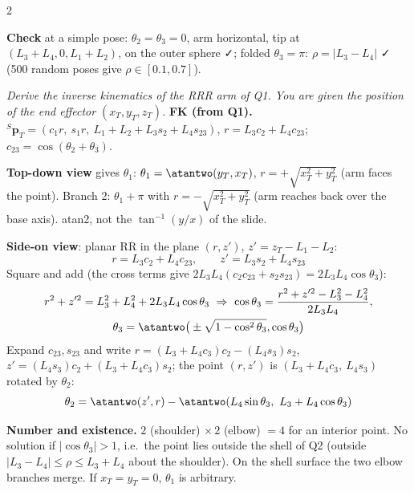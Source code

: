 \begin{multicols}{2}
\begin{examq}
\begin{center}
\end{center}
\textbf{Check} at a simple pose: $\theta_2=\theta_3=0$, arm horizontal, tip at $(L_3+L_4,0,L_1+L_2)$, on the outer sphere ✓; folded $\theta_3=\pi$: $\rho=|L_3-L_4|$ ✓ (500 random poses give $\rho\in[0.1,0.7]$). \chk
\end{examq}

\begin{examq}
\label{w3:q3box}
\emph{Derive the inverse kinematics of the RRR arm of Q1. You are given the position of the end effector $(x_T,y_T,z_T)$.}
\solution
\textbf{FK (from Q1).} ${}^S\mathbf p_T=(c_1r,\ s_1r,\ L_1+L_2+L_3s_2+L_4s_{23})$, $r=L_3c_2+L_4c_{23}$; $c_{23}=\cos(\theta_2+\theta_3)$.
\par \textbf{Top-down view} gives $\theta_1$: $\theta_1=\atantwo(y_T,x_T)$, $r=+\sqrt{x_T^2+y_T^2}$ (arm faces the point). Branch 2: $\theta_1+\pi$ with $r=-\sqrt{x_T^2+y_T^2}$ (arm reaches back over the base axis). atan2, not the $\tan^{-1}(y/x)$ of the slide.\\
\par \textbf{Side-on view}: planar RR in the plane $(r,z')$, $z'=z_T-L_1-L_2$:
\[r=L_3c_2+L_4c_{23},\qquad z'=L_3s_2+L_4s_{23}\]
Square and add (the cross terms give $2L_3L_4(c_2c_{23}+s_2s_{23})=2L_3L_4\cos\theta_3$):
\begin{gather*}r^2+z'^2=L_3^2+L_4^2+2L_3L_4\cos\theta_3\ \Rightarrow\ \cos\theta_3=\frac{r^2+z'^2-L_3^2-L_4^2}{2L_3L_4},\\ \theta_3=\atantwo\big(\pm\sqrt{1-\cos^2\theta_3},\cos\theta_3\big)\end{gather*}
Expand $c_{23},s_{23}$ and write $r=(L_3+L_4c_3)c_2-(L_4s_3)s_2$, $z'=(L_4s_3)c_2+(L_3+L_4c_3)s_2$; the point $(r,z')$ is $(L_3+L_4c_3,\ L_4s_3)$ rotated by $\theta_2$:
\[\theta_2=\atantwo(z',r)-\atantwo(L_4\sin\theta_3,\ L_3+L_4\cos\theta_3)\]
\par \textbf{Number and existence.} $2$ (shoulder) $\times\,2$ (elbow) $=4$ for an interior point. No solution if $|\cos\theta_3|>1$, i.e.\ the point lies outside the shell of Q2 (outside $|L_3-L_4|\le\rho\le L_3+L_4$ about the shoulder). On the shell surface the two elbow branches merge. If $x_T=y_T=0$, $\theta_1$ is arbitrary.\\

\end{examq}
\end{multicols}
